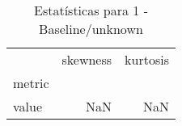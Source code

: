 \begin{table}[htbp]
\caption{Estatísticas para 1 - Baseline/unknown}
\label{tab:1_-_baseline_unknown_skewkurt}
\begin{tabular}{lrr}
\toprule
 & skewness & kurtosis \\
metric &  &  \\
\midrule
value & NaN & NaN \\
\bottomrule
\end{tabular}
\end{table}
